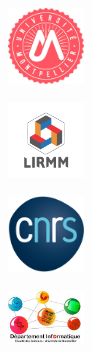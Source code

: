\newcommand\interline{0.3cm}

\thispagestyle{empty}


\begin{titlepage}
\framethispage[1.9cm]%
\begin{center}
\begin{minipage}[b]{3.5cm}

\includegraphics[width=2cm]{LOGO_RVB_grand-UM.jpg}

\end{minipage}\begin{minipage}[b]{3.5cm}
\includegraphics[width=2cm]{lirmm.fr.png}

\end{minipage}\begin{minipage}[b]{3.5cm}
\includegraphics[width=2cm]{logo.png}

\end{minipage}\begin{minipage}[b]{3cm}
\includegraphics[width=2cm]{LOGO_DTP_INFORMATIQUE.jpg}

\end{minipage}


\end{center}
\end{titlepage}

